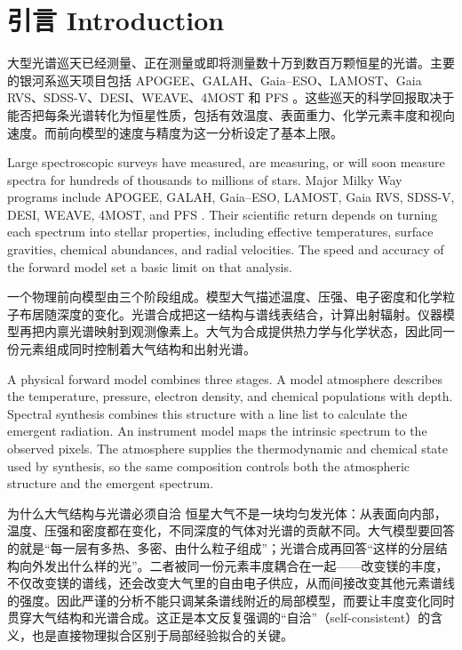 \section{引言 Introduction}\label{sec:introduction}

大型光谱巡天已经测量、正在测量或即将测量数十万到数百万颗恒星的光谱。主要的银河系巡天项目包括 APOGEE、GALAH、Gaia--ESO、LAMOST、Gaia RVS、SDSS-V、DESI、WEAVE、4MOST 和 PFS \citep{Cui2012,Dalton2012,Gilmore2012,Takada2014,DeSilva2015,Kollmeier2017,Majewski2017,Chiappini2019,Cooper2023,Creevey2023}。这些巡天的科学回报取决于能否把每条光谱转化为恒星性质，包括有效温度、表面重力、化学元素丰度和视向速度。而前向模型的速度与精度为这一分析设定了基本上限。

\begin{EN}
Large spectroscopic surveys have measured, are measuring, or will soon measure
spectra for hundreds of thousands to millions of stars. Major Milky Way
programs include APOGEE, GALAH, Gaia--ESO, LAMOST, Gaia RVS, SDSS-V, DESI,
WEAVE, 4MOST, and PFS
\citep{Cui2012,Dalton2012,Gilmore2012,Takada2014,DeSilva2015,
Kollmeier2017,Majewski2017,Chiappini2019,Cooper2023,Creevey2023}.
Their scientific return depends on turning
each spectrum into stellar properties, including effective temperatures,
surface gravities, chemical abundances, and radial velocities.
The speed and accuracy of the forward model set a basic limit on that analysis.
\end{EN}

一个物理前向模型由三个阶段组成。模型大气描述温度、压强、电子密度和化学粒子布居随深度的变化。光谱合成把这一结构与谱线表结合，计算出射辐射。仪器模型再把内禀光谱映射到观测像素上。大气为合成提供热力学与化学状态，因此同一份元素组成同时控制着大气结构和出射光谱。

\begin{EN}
A physical forward model combines three stages. A model atmosphere describes
the temperature, pressure, electron density, and chemical populations with
depth. Spectral synthesis combines this structure with a line list to calculate
the emergent radiation. An instrument model maps the intrinsic spectrum to the
observed pixels. The atmosphere supplies the thermodynamic and chemical state
used by synthesis, so the same composition controls both the atmospheric
structure and the emergent spectrum.
\end{EN}

\begin{physbox}{为什么大气结构与光谱必须自洽}
恒星大气不是一块均匀发光体：从表面向内部，温度、压强和密度都在变化，不同深度的气体对光谱的贡献不同。大气模型要回答的就是“每一层有多热、多密、由什么粒子组成”；光谱合成再回答“这样的分层结构向外发出什么样的光”。二者被同一份元素丰度耦合在一起——改变镁的丰度，不仅改变镁的谱线，还会改变大气里的自由电子供应，从而间接改变其他元素谱线的强度。因此严谨的分析不能只调某条谱线附近的局部模型，而要让丰度变化同时贯穿大气结构和光谱合成。这正是本文反复强调的“自洽”（self-consistent）的含义，也是直接物理拟合区别于局部经验拟合的关键。
\end{physbox}

